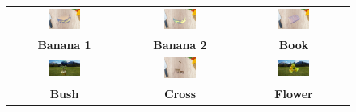 \documentclass[a4paper,12pt]{article}
\begin{document}
\begin{figure}[H]
    \centering
    \begin{tabular}{ccc}
        \includegraphics[width=0.3\textwidth]{my_reasults/PS_res/banan1_result.png} & 
        \includegraphics[width=0.3\textwidth]{my_reasults/PS_res/banana2_result.png} & 
        \includegraphics[width=0.3\textwidth]{my_reasults/PS_res/book_result.png} \\
        \textbf{Banana 1} & \textbf{Banana 2} & \textbf{Book} \\
        \includegraphics[width=0.3\textwidth]{my_reasults/PS_res/bush_result.png} & 
        \includegraphics[width=0.3\textwidth]{my_reasults/PS_res/cross_result.png} & 
        \includegraphics[width=0.3\textwidth]{my_reasults/PS_res/flower_result.png} \\
        \textbf{Bush} & \textbf{Cross} & \textbf{Flower} \\

\end{tabular}
\end{figure}
\end{document}
